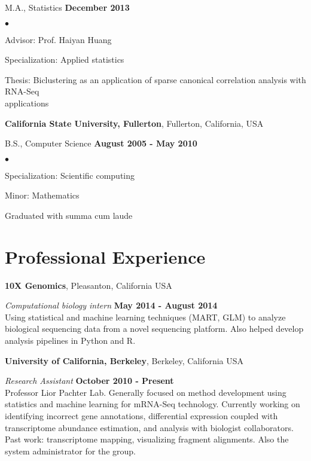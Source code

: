 \documentclass[margin,line]{res}
\newenvironment{list2}{
  \begin{list}{$\bullet$}{%
      \setlength{\itemsep}{0in}
      \setlength{\parsep}{0in} \setlength{\parskip}{0in}
      \setlength{\topsep}{0in} \setlength{\partopsep}{0in}
      \setlength{\leftmargin}{0.2in}}}{\end{list}}
\begin{document}
\begin{resume}
M.A., Statistics \hfill {\bf
 December 2013}\\
\vspace{-.45cm}
\begin{list2}
\vspace*{1mm}
\item Advisor: Prof. Haiyan Huang
\item Specialization: Applied statistics
\item Thesis: Biclustering as an application of sparse canonical correlation analysis with RNA-Seq \\applications
\end{list2}



{\bf California State University, Fullerton}, Fullerton, California, USA

\vspace{-.3cm}
B.S., Computer Science \hfill {\bf August 2005 - May 2010}\\
\vspace{-.45cm}
\begin{list2}
\vspace*{1mm}
\item Specialization: Scientific computing
\item Minor: Mathematics
\item Graduated with summa cum laude
\end{list2}

\section{\sc Professional Experience}

{\bf 10X Genomics}, Pleasanton, California USA
\vspace{-.3cm}

{\em Computational biology intern} \hfill {\bf May 2014 - August 2014}\\
Using statistical and machine learning techniques (MART, GLM) to analyze
biological sequencing data from a novel sequencing platform. Also helped
develop analysis pipelines in Python and R.

{\bf University of California, Berkeley}, Berkeley, California USA
\vspace{-.3cm}

{\em Research Assistant} \hfill {\bf October 2010 - Present}\\
Professor Lior Pachter Lab. Generally focused on method development using
statistics and machine learning for mRNA-Seq technology. Currently working on
identifying incorrect gene annotations, differential expression coupled with
transcriptome abundance estimation, and analysis with biologist collaborators.
Past work: transcriptome mapping, visualizing fragment alignments. Also the
system administrator for the group.


\end{resume}
\end{document}
